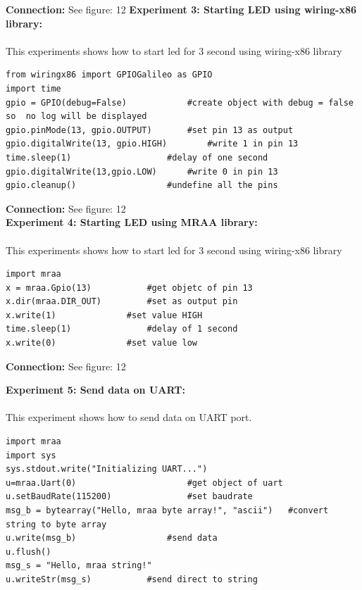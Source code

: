 \documentclass[11pt,a4paper]{article}
\begin{document}
\textbf{Connection:}
See figure: 12
\vspace{1cm}
    \textbf{\Large{Experiment 3: Starting LED using wiring-x86 library:}}\\
    \vspace{.1cm}\\
   This experiments shows how to start led for 3 second using wiring-x86 library 
\begin{lstlisting}
from wiringx86 import GPIOGalileo as GPIO
import time
gpio = GPIO(debug=False)			#create object with debug = false so  no log will be displayed
gpio.pinMode(13, gpio.OUTPUT)		#set pin 13 as output
gpio.digitalWrite(13, gpio.HIGH)		#write 1 in pin 13
time.sleep(1)					#delay of one second 
gpio.digitalWrite(13,gpio.LOW)		#write 0 in pin 13
gpio.cleanup()					#undefine all the pins
\end{lstlisting}


\textbf{Connection:}
See figure: 12\\
\vspace{1cm}
    \textbf{\Large{Experiment 4: Starting LED using MRAA library:}}\\
    \vspace{.1cm}\\
   This experiments shows how to start led for 3 second using wiring-x86 library 
\begin{lstlisting}
import mraa
x = mraa.Gpio(13)			#get objetc of pin 13
x.dir(mraa.DIR_OUT)			#set as output pin
x.write(1)				#set value HIGH
time.sleep(1)				#delay of 1 second
x.write(0)				#set value low
\end{lstlisting}

\textbf{Connection:}
See figure: 12

\newpage
    \textbf{\Large{Experiment 5: Send data on UART:}}\\
    \vspace{.1cm}\\
   This experiment shows how to send data on UART port.
\begin{lstlisting}
import mraa
import sys
sys.stdout.write("Initializing UART...")
u=mraa.Uart(0)						#get object of uart
u.setBaudRate(115200)				#set baudrate
msg_b = bytearray("Hello, mraa byte array!", "ascii")	#convert string to byte array
u.write(msg_b)					#send data
u.flush()				
msg_s = "Hello, mraa string!"
u.writeStr(msg_s)			#send direct to string
\end{lstlisting}
\end{document}
